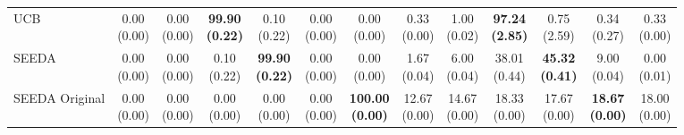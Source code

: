 \begin{table}[H]
{\begin{tabular}{l|cccccc|cccccc}
UCB & \makecell{0.00 \\ (0.00)} & \makecell{0.00 \\ (0.00)} & {\cellcolor[HTML]{C8E6C9}} \bfseries \makecell{99.90 \\ (0.22)} & \makecell{0.10 \\ (0.22)} & \makecell{0.00 \\ (0.00)} & \makecell{0.00 \\ (0.00)} & \makecell{0.33 \\ (0.00)} & \makecell{1.00 \\ (0.02)} & {\cellcolor[HTML]{C8E6C9}} \bfseries \makecell{97.24 \\ (2.85)} & \makecell{0.75 \\ (2.59)} & \makecell{0.34 \\ (0.27)} & \makecell{0.33 \\ (0.00)} \\
SEEDA & \makecell{0.00 \\ (0.00)} & \makecell{0.00 \\ (0.00)} & {\cellcolor[HTML]{C8E6C9}} \makecell{0.10 \\ (0.22)} & \bfseries \makecell{99.90 \\ (0.22)} & \makecell{0.00 \\ (0.00)} & \makecell{0.00 \\ (0.00)} & \makecell{1.67 \\ (0.04)} & \makecell{6.00 \\ (0.04)} & {\cellcolor[HTML]{C8E6C9}} \makecell{38.01 \\ (0.44)} & \bfseries \makecell{45.32 \\ (0.41)} & \makecell{9.00 \\ (0.04)} & \makecell{0.00 \\ (0.01)} \\
SEEDA Original & \makecell{0.00 \\ (0.00)} & \makecell{0.00 \\ (0.00)} & {\cellcolor[HTML]{C8E6C9}} \makecell{0.00 \\ (0.00)} & \makecell{0.00 \\ (0.00)} & \makecell{0.00 \\ (0.00)} & \bfseries \makecell{100.00 \\ (0.00)} & \makecell{12.67 \\ (0.00)} & \makecell{14.67 \\ (0.00)} & {\cellcolor[HTML]{C8E6C9}} \makecell{18.33 \\ (0.00)} & \makecell{17.67 \\ (0.00)} & \bfseries \makecell{18.67 \\ (0.00)} & \makecell{18.00 \\ (0.00)} \\

\end{tabular}}
\end{table}
